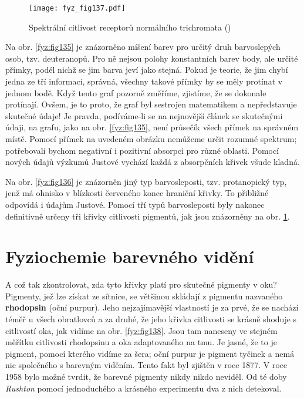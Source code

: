 {    \begin{figure}[ht!]  %
      \centering
      \texttt{[image: fyz\_fig137.pdf]}
      \caption{Spektrální citlivost receptorů normálního trichromata
              (\cite[s.~477]{Feynman01})}
      \label{fyz:fig137}
    \end{figure}
    Na obr. \ref{fyz:fig135} je znázorněno míšení barev pro určitý druh barvoslepých osob, tzv. 
    deuteranopů. Pro ně nejsou polohy konstantních barev body, ale určité přímky, podél nichž se 
    jim barva jeví jako stejná. Pokud je teorie, že jim chybí jedna ze tří informací, správná, 
    všechny takové přímky by se měly protínat v jednom bodě. Když tento graf pozorně změříme, 
    zjistíme, že se dokonale protínají. Ovšem, je to proto, že graf byl sestrojen matematikem a 
    nepředstavuje skutečné údaje! Je pravda, podíváme-li se na nejnovější článek se skutečnými 
    údaji, na grafu, jako na obr. \ref{fyz:fig135}, není průsečík všech přímek na správném místě. 
    Pomocí přímek na uvedeném obrázku nemůžeme určit rozumné spektrum; potřebovali bychom negativní 
    i pozitivní absorpci pro různé oblasti. Pomocí nových údajů výzkumů Justové vychází každá z 
    absorpčních křivek všude kladná. 

    Na obr. \ref{fyz:fig136} je znázorněn jiný typ barvosleposti, tzv. protanopický typ, jenž má 
    ohnisko v blízkosti červeného konce hraniční křivky. To přibližné odpovídá i údajům Justové. 
    Pomocí tří typů barvosleposti byly nakonec definitivně určeny tři křivky citlivosti pigmentů, 
    jak jsou znázorněny na obr. \ref{fyz:fig137}.
    
  \section{Fyziochemie barevného vidění}\label{fyz:IchapXXXVsecVI}
    A což tak zkontrolovat, zda tyto křivky platí pro skutečné pigmenty v oku? Pigmenty, jež lze 
    získat ze sítnice, se většinou skládají z pigmentu nazvaného \textbf{rhodopsin} (oční purpur). 
    Jeho nejzajímavější vlastností je za prvé, že se nachází téměř u všech obratlovců a za druhé, 
    že jeho křivka citlivosti se krásně shoduje s citlivostí oka, jak vidíme na obr. 
    \ref{fyz:fig138}. Jsou tam naneseny ve stejném měřítku citlivosti rhodopsinu a oka adaptovaného 
    na tmu. Je jasné, že to je pigment, pomocí kterého vidíme za šera; oční purpur je pigment 
    tyčinek a nemá nic společného s barevným viděním. Tento fakt byl zjištěn v roce \num{1877}. V 
    roce 1958 bylo možné tvrdit, že barevné pigmenty nikdy nikdo neviděl. Od té doby \emph{Rushton} 
    pomocí jednoduchého a krásného experimentu dva z nich detekoval.

}
